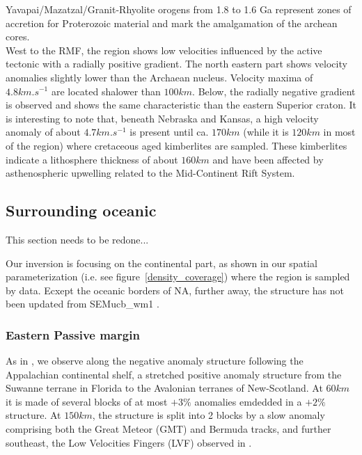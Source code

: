 \documentclass[12pt]{article}
\begin{document}



	Yavapai/Mazatzal/Granit-Rhyolite orogens from 1.8 to 1.6 Ga represent zones of accretion for Proterozoic material and mark the amalgamation of the archean cores. \citep{hoffman1988united} \\
	West to the RMF, the region shows low velocities influenced by the active tectonic with a radially positive gradient. 
	The north eastern part shows velocity anomalies slightly lower than the Archaean nucleus. Velocity maxima of $4.8km.s^{-1}$ are located shalower than $100km$. 
	Below, the radially negative gradient is observed and shows the same characteristic than the eastern Superior craton. It is interesting to note that, beneath Nebraska and Kansas, a high velocity anomaly of about $4.7km.s^{-1}$ is present until ca. $170km$ (while it is $120km$ in most of the region) where cretaceous aged kimberlites are sampled. 
	These kimberlites indicate a lithosphere thickness of about $160km$ and have been affected by asthenospheric upwelling related to the Mid-Continent Rift System. \citep{griffin2004lithosphere}





\subsection{Surrounding oceanic} This section needs to be redone...

	Our inversion is focusing on the continental part, as shown in our spatial parameterization (i.e. see figure~\ref{density_coverage}) where the region is sampled by data.
	Ecxept the oceanic borders of NA, further away, the structure has not been updated from SEMucb\_wm1 \citep{french2014whole}. 

	\subsubsection{Eastern Passive margin}
		As in \cite{schaeffer2014imaging,yuan2014lithospheric,james2014rayleigh,silveira2002anisotropic,mocquet1990three}, we observe along the negative anomaly structure following the Appalachian continental shelf, a stretched positive anomaly structure from the Suwanne terrane in Florida to the Avalonian terranes of New-Scotland. 
		At $60km$ it is made of several blocks of at most $+3\%$ anomalies emdedded in a $+2\%$ structure. At $150km$, the structure is split into 2 blocks by a slow anomaly comprising both the Great Meteor (GMT) and Bermuda tracks, and further southeast, the Low Velocities Fingers (LVF) observed in \cite{french2013waveform}. 
\end{document}
